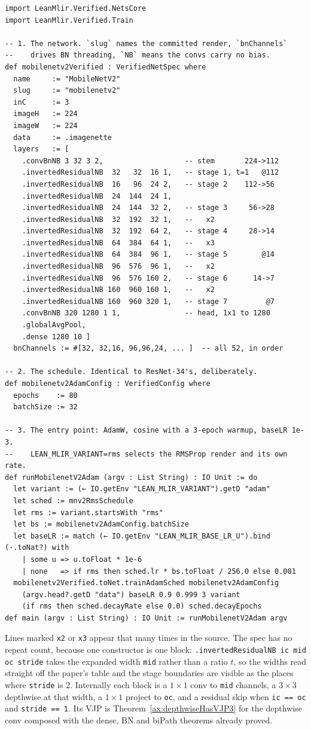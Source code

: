 \begin{verbatim}
import LeanMlir.Verified.NetsCore
import LeanMlir.Verified.Train

-- 1. The network. `slug` names the committed render, `bnChannels`
--    drives BN threading, `NB` means the convs carry no bias.
def mobilenetv2Verified : VerifiedNetSpec where
  name     := "MobileNetV2"
  slug     := "mobilenetv2"
  inC      := 3
  imageH   := 224
  imageW   := 224
  data     := .imagenette
  layers   := [
    .convBnNB 3 32 3 2,                   -- stem       224->112
    .invertedResidualNB  32   32  16 1,   -- stage 1, t=1   @112
    .invertedResidualNB  16   96  24 2,   -- stage 2    112->56
    .invertedResidualNB  24  144  24 1,
    .invertedResidualNB  24  144  32 2,   -- stage 3     56->28
    .invertedResidualNB  32  192  32 1,   --   x2
    .invertedResidualNB  32  192  64 2,   -- stage 4     28->14
    .invertedResidualNB  64  384  64 1,   --   x3
    .invertedResidualNB  64  384  96 1,   -- stage 5        @14
    .invertedResidualNB  96  576  96 1,   --   x2
    .invertedResidualNB  96  576 160 2,   -- stage 6      14->7
    .invertedResidualNB 160  960 160 1,   --   x2
    .invertedResidualNB 160  960 320 1,   -- stage 7         @7
    .convBnNB 320 1280 1 1,               -- head, 1x1 to 1280
    .globalAvgPool,
    .dense 1280 10 ]
  bnChannels := #[32, 32,16, 96,96,24, ... ]  -- all 52, in order

-- 2. The schedule. Identical to ResNet-34's, deliberately.
def mobilenetv2AdamConfig : VerifiedConfig where
  epochs    := 80
  batchSize := 32

-- 3. The entry point: AdamW, cosine with a 3-epoch warmup, baseLR 1e-3.
--    LEAN_MLIR_VARIANT=rms selects the RMSProp render and its own rate.
def runMobilenetV2Adam (argv : List String) : IO Unit := do
  let variant := (← IO.getEnv "LEAN_MLIR_VARIANT").getD "adam"
  let sched := mnv2RmsSchedule
  let rms := variant.startsWith "rms"
  let bs := mobilenetv2AdamConfig.batchSize
  let baseLR := match (← IO.getEnv "LEAN_MLIR_BASE_LR_U").bind (·.toNat?) with
    | some u => u.toFloat * 1e-6
    | none   => if rms then sched.lr * bs.toFloat / 256.0 else 0.001
  mobilenetv2Verified.toNet.trainAdamSched mobilenetv2AdamConfig
    (argv.head?.getD "data") baseLR 0.9 0.999 3 variant
    (if rms then sched.decayRate else 0.0) sched.decayEpochs
def main (argv : List String) : IO Unit := runMobilenetV2Adam argv
\end{verbatim}

\noindent Lines marked \texttt{x2} or \texttt{x3} appear that many times
in the source. The spec has no repeat count, because one constructor is
one block: \texttt{.invertedResidualNB ic mid oc stride} takes the
expanded width \texttt{mid} rather than a ratio \(t\), so the
widths read straight off the paper's table and the stage boundaries are
visible as the places where \texttt{stride} is 2. Internally each block
is a $1 \times 1$ conv to \texttt{mid} channels, a $3 \times 3$
depthwise at that width, a $1 \times 1$ project to \texttt{oc}, and a
residual skip when \texttt{ic == oc} and \texttt{stride == 1}. Its VJP
is Theorem~\ref{ax:depthwiseHasVJP3} for the depthwise conv composed with
the dense, BN and biPath theorems already proved.

